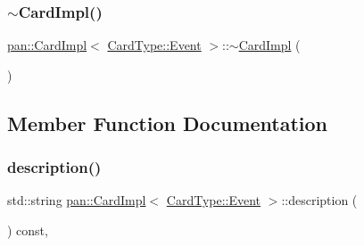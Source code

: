 \mbox{\label{classpan_1_1_card_impl_3_01_card_type_1_1_event_01_4_a57a0df69033b57c0476c3d58599cb079}} 
\subsubsection{\texorpdfstring{$\sim$\+Card\+Impl()}{~CardImpl()}}
{\footnotesize\ttfamily \hyperlink{classpan_1_1_card_impl}{pan\+::\+Card\+Impl}$<$ \hyperlink{namespacepan_a1f7350bfd0421afeabe9fa95c16fa811aa4ecfc70574394990cf17bd83df499f7}{Card\+Type\+::\+Event} $>$\+::$\sim$\hyperlink{classpan_1_1_card_impl}{Card\+Impl} (\begin{DoxyParamCaption}{ }\end{DoxyParamCaption})\hspace{0.3cm}{\ttfamily [default]}}



\subsection{Member Function Documentation}
\mbox{\label{classpan_1_1_card_impl_3_01_card_type_1_1_event_01_4_aa5c7d2729e0bfb141a0d8487a590a580}} 
\subsubsection{\texorpdfstring{description()}{description()}}
{\footnotesize\ttfamily std\+::string \hyperlink{classpan_1_1_card_impl}{pan\+::\+Card\+Impl}$<$ \hyperlink{namespacepan_a1f7350bfd0421afeabe9fa95c16fa811aa4ecfc70574394990cf17bd83df499f7}{Card\+Type\+::\+Event} $>$\+::description (\begin{DoxyParamCaption}{ }\end{DoxyParamCaption}) const\hspace{0.3cm}{\ttfamily [inline]}, {\ttfamily [virtual]}}



